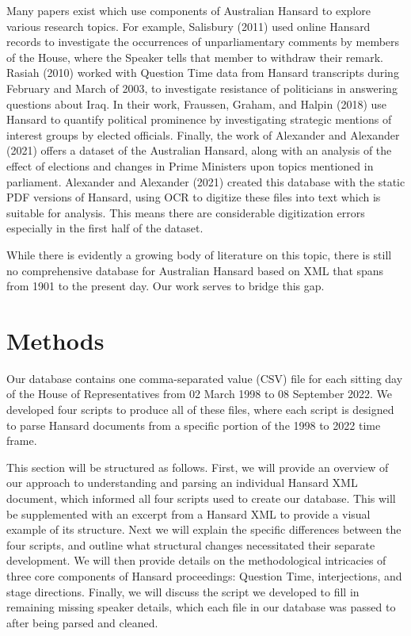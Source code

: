 \documentclass[
  letterpaper,
  DIV=11,
  numbers=noendperiod]{scrartcl}
\begin{document}
Many papers exist which use components of Australian Hansard to explore
various research topics. For example, Salisbury (2011) used online
Hansard records to investigate the occurrences of unparliamentary
comments by members of the House, where the Speaker tells that member to
withdraw their remark. Rasiah (2010) worked with Question Time data from
Hansard transcripts during February and March of 2003, to investigate
resistance of politicians in answering questions about Iraq. In their
work, Fraussen, Graham, and Halpin (2018) use Hansard to quantify
political prominence by investigating strategic mentions of interest
groups by elected officials. Finally, the work of Alexander and
Alexander (2021) offers a dataset of the Australian Hansard, along with
an analysis of the effect of elections and changes in Prime Ministers
upon topics mentioned in parliament. Alexander and Alexander (2021)
created this database with the static PDF versions of Hansard, using OCR
to digitize these files into text which is suitable for analysis. This
means there are considerable digitization errors especially in the first
half of the dataset.

While there is evidently a growing body of literature on this topic,
there is still no comprehensive database for Australian Hansard based on
XML that spans from 1901 to the present day. Our work serves to bridge
this gap.

\hypertarget{methods}{%
\section{Methods}\label{methods}}

Our database contains one comma-separated value (CSV) file for each
sitting day of the House of Representatives from 02 March 1998 to 08
September 2022. We developed four scripts to produce all of these files,
where each script is designed to parse Hansard documents from a specific
portion of the 1998 to 2022 time frame.

This section will be structured as follows. First, we will provide an
overview of our approach to understanding and parsing an individual
Hansard XML document, which informed all four scripts used to create our
database. This will be supplemented with an excerpt from a Hansard XML
to provide a visual example of its structure. Next we will explain the
specific differences between the four scripts, and outline what
structural changes necessitated their separate development. We will then
provide details on the methodological intricacies of three core
components of Hansard proceedings: Question Time, interjections, and
stage directions. Finally, we will discuss the script we developed to
fill in remaining missing speaker details, which each file in our
database was passed to after being parsed and cleaned.
\end{document}
